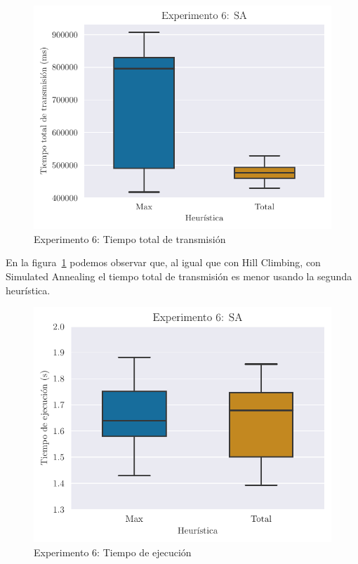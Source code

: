 \begin{figure}[H]
    \centering
    \includegraphics{include/plots/ex6fix_ttt_bplot.pdf}
    \caption{Experimento 6: Tiempo total de transmisión}%
    \label{fig:ex6ttt}
\end{figure}

En la figura~\ref{fig:ex6ttt} podemos observar que, al igual que con Hill Climbing, con Simulated Annealing
el tiempo total de transmisión es menor usando la segunda heurística.

\begin{figure}[H]
    \centering
    \includegraphics{include/plots/ex6fix_time_bplot.pdf}
    \caption{Experimento 6: Tiempo de ejecución}%
    \label{fig:ex6time}
\end{figure}

